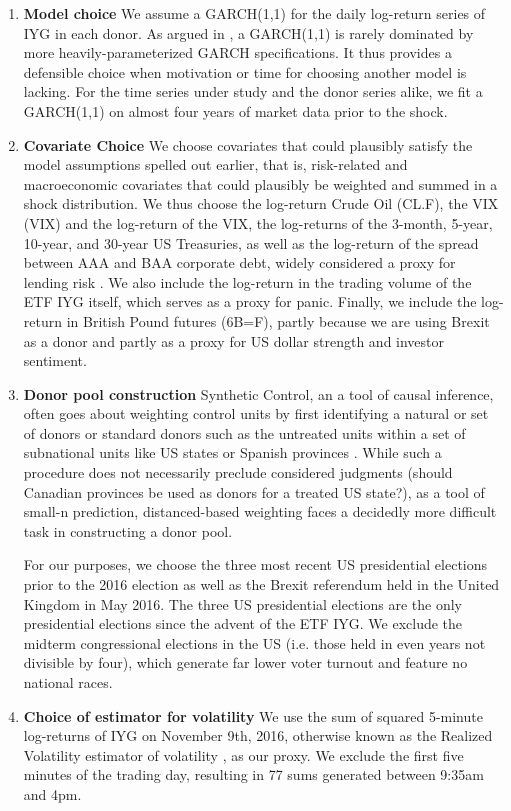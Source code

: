 \documentclass[11pt]{article}
\theoremstyle{definition}
\begin{document}
\begin{enumerate}
    \item \textbf{Model choice} We assume a GARCH(1,1) for the daily log-return series of IYG in each donor.  As argued in \citet{hansen2005forecast}, a GARCH(1,1) is rarely dominated by more heavily-parameterized GARCH specifications.  It thus provides a defensible choice when motivation or time for choosing another model is lacking.  For the time series under study and the donor series alike, we fit a GARCH(1,1) on almost four years of market data prior to the shock.

    \item \textbf{Covariate Choice} We choose covariates that could plausibly satisfy the model assumptions spelled out earlier, that is, risk-related and macroeconomic covariates that could plausibly be weighted and summed in a shock distribution.  We thus choose the log-return Crude Oil (CL.F), the VIX (VIX) and the log-return of the VIX, the log-returns of the 3-month, 5-year, 10-year, and 30-year US Treasuries, as well as the log-return of the spread between AAA and BAA corporate debt, widely considered a proxy for lending risk \citep{goodell2013us, kane1996p}.  We also include the log-return in the trading volume of the ETF IYG itself, which serves as a proxy for panic.  Finally, we include the log-return in British Pound futures (6B=F), partly because we are using Brexit as a donor and partly as a proxy for US dollar strength and investor sentiment.

    \item \textbf{Donor pool construction} Synthetic Control, an a tool of causal inference, often goes about weighting control units by first identifying a natural or set of donors or standard donors such as the untreated units within a set of subnational units like US states or Spanish provinces \citep{abadie2003economic, abadie2010synthetic}.  While such a procedure does not necessarily preclude considered judgments (should Canadian provinces be used as donors for a treated US state?), as a tool of small-n prediction, distanced-based weighting faces a decidedly more difficult task in constructing a donor pool.  
    
    For our purposes, we choose the three most recent US presidential elections prior to the 2016 election as well as the Brexit referendum held in the United Kingdom in May 2016.  The three US presidential elections are the only presidential elections since the advent of the ETF IYG.  We exclude the midterm congressional elections in the US (i.e. those held in even years not divisible by four), which generate far lower voter turnout and feature no national races.

    \item \textbf{Choice of estimator for volatility} We use the sum of squared 5-minute log-returns of IYG on November 9th, 2016, otherwise known as the Realized Volatility estimator of volatility \citep{andersen2009realized}, as our proxy.  We exclude the first five minutes of the trading day, resulting in 77 sums generated between 9:35am and 4pm.
\end{enumerate} 
\end{document}
